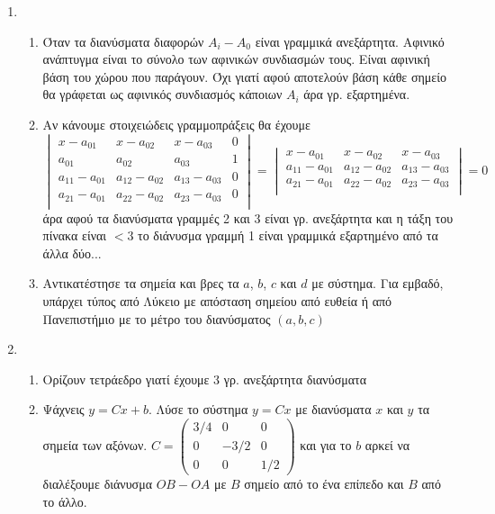 \documentclass[12pt]{article}
\begin{document}
\begin{enumerate}
    \item
    \begin{enumerate}
      \item Όταν τα διανύσματα διαφορών $A_i-A_0$ είναι γραμμικά ανεξάρτητα. Αφινικό ανάπτυγμα είναι το σύνολο των αφινικών συνδιασμών τους. Είναι αφινική βάση του χώρου που παράγουν. Όχι γιατί αφού αποτελούν βάση κάθε σημείο θα γράφεται ως αφινικός συνδιασμός κάποιων $A_i$ άρα γρ. εξαρτημένα.
      \item
        Αν κάνουμε στοιχειώδεις γραμμοπράξεις θα έχουμε
          \[ \begin{vmatrix}
          x-a_01 & x-a_02 & x-a_03 & 0 \\
          a_01 & a_02 & a_03 & 1 \\
          a_11-a_01 & a_12-a_02 & a_13-a_03 & 0 \\
          a_21-a_01 & a_22-a_02 & a_23-a_03 & 0 \\
        \end{vmatrix} = \begin{vmatrix}
        x-a_01 & x-a_02 & x-a_03\\
        a_11-a_01 & a_12-a_02 & a_13-a_03\\
        a_21-a_01 & a_22-a_02 & a_23-a_03\\
      \end{vmatrix}=0 \] άρα αφού τα διανύσματα γραμμές 2 και 3 είναι γρ. ανεξάρτητα και η τάξη του πίνακα είναι $<3$ το διάνυσμα γραμμή 1 είναι γραμμικά εξαρτημένο από τα άλλα δύο...
      \item Αντικατέστησε τα σημεία και βρες τα $a$, $b$, $c$ και $d$ με σύστημα. Για εμβαδό, υπάρχει τύπος από Λύκειο με απόσταση σημείου από ευθεία ή από Πανεπιστήμιο με το μέτρο του διανύσματος $(a,b,c)$
  \end{enumerate}

    \item
    \begin{enumerate}
      \item
        Ορίζουν τετράεδρο γιατί έχουμε 3 γρ. ανεξάρτητα διανύσματα
      \item
        Ψάχνεις $y=Cx+b$. Λύσε το σύστημα $y=Cx$ με διανύσματα $x$ και $y$ τα σημεία των αξόνων.
        $C=\begin{pmatrix}
          3/4 & 0 & 0 \\
          0 & -3/2 & 0 \\
          0 & 0 & 1/2
        \end{pmatrix}$
        και για το $b$ αρκεί να διαλέξουμε διάνυσμα $OB-OA$ με $B$ σημείο από το ένα επίπεδο και $B$ από το άλλο.
    \end{enumerate}
  \end{enumerate}
\end{document}
